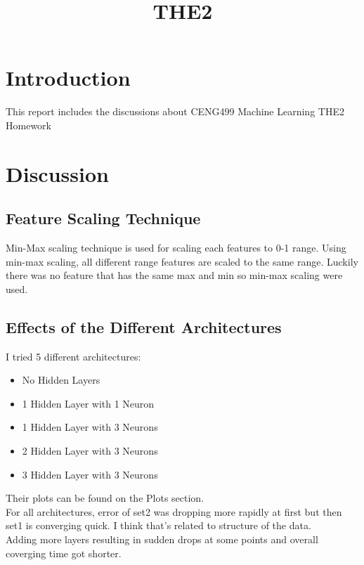 \documentclass[conference]{IEEEtran}
\begin{document}
\title{THE2\\
}

\author{
}

\maketitle


\section{Introduction}
This report includes the discussions about CENG499 Machine Learning THE2 Homework \\

\section{Discussion}

\subsection{Feature Scaling Technique}

Min-Max scaling technique is used for scaling each  features to 0-1 range. Using min-max scaling, all different range features are scaled to the same range. Luckily there was no feature that has the same max and min so min-max scaling were used.

\subsection{Effects of the Different Architectures}

I tried 5 different architectures:\\
\begin{itemize}
    \item No Hidden Layers
    \item 1 Hidden Layer with 1 Neuron
    \item 1 Hidden Layer with 3 Neurons
    \item 2 Hidden Layer with 3 Neurons
    \item 3 Hidden Layer with 3 Neurons
\end{itemize}

Their plots can be found on the Plots section. \\
For all architectures, error of set2 was dropping more rapidly at first but then set1 is converging quick. I  think that's related to structure of the data.\\
Adding more layers resulting in sudden drops at some points and overall coverging time got shorter.
\end{document}
